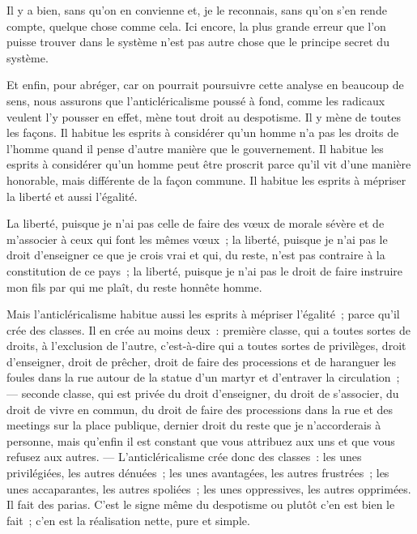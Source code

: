 \documentclass[french,twoside]{book} %
\begin{document}
\noindent  Il y a bien, sans qu’on en convienne et, je le reconnais, sans qu’on s’en rende compte, quelque chose comme cela. Ici encore, la plus grande erreur que l’on puisse trouver dans le système n’est pas autre chose que le principe secret du système.\par
Et enfin, pour abréger, car on pourrait poursuivre cette analyse en beaucoup de sens, nous assurons que l’anticléricalisme poussé à fond, comme les radicaux veulent l’y pousser en effet, mène tout droit au despotisme. Il y mène de toutes les façons. Il habitue les esprits à considérer qu’un homme n’a pas les droits de l’homme quand il pense d’autre manière que le gouvernement. Il habitue les esprits à considérer qu’un homme peut être proscrit parce qu’il vit d’une manière honorable, mais différente de la façon commune. Il habitue les esprits à mépriser la liberté et aussi l’égalité.\par
La liberté, puisque je n’ai pas celle de faire des vœux de morale sévère et de m’associer à ceux qui font les mêmes vœux ; la liberté, puisque je n’ai pas le droit d’enseigner ce que je crois vrai et qui, du reste, n’est pas contraire à la constitution de ce pays ; la liberté, puisque je n’ai pas le droit de faire instruire mon fils par qui me plaît, du reste honnête homme.\par
 Mais l’anticléricalisme habitue aussi les esprits à mépriser l’égalité ; parce qu’il crée des classes. Il en crée au moins deux : première classe, qui a toutes sortes de droits, à l’exclusion de l’autre, c’est-à-dire qui a toutes sortes de privilèges, droit d’enseigner, droit de prêcher, droit de faire des processions et de haranguer les foules dans la rue autour de la statue d’un martyr et d’entraver la circulation ; — seconde classe, qui est privée du droit d’enseigner, du droit de s’associer, du droit de vivre en commun, du droit de faire des processions dans la rue et des meetings sur la place publique, dernier droit du reste que je n’accorderais à personne, mais qu’enfin il est constant que vous attribuez aux uns et que vous refusez aux autres. — L’anticléricalisme crée donc des classes : les unes privilégiées, les autres dénuées ; les unes avantagées, les autres frustrées ; les unes accaparantes, les autres spoliées ; les unes oppressives, les autres opprimées. Il fait des parias. C’est le signe même du despotisme ou plutôt c’en est bien le fait ; c’en est la réalisation nette, pure et simple.\par
\end{document}
